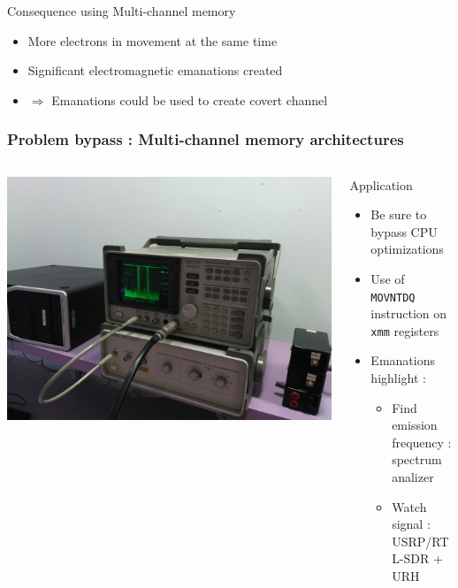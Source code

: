 \begin{frame}
\begin{block}{Consequence using Multi-channel memory}
\begin{itemize}
\item More electrons in movement at the same time
\item Significant electromagnetic emanations created
\item $\Rightarrow$ Emanations could be used to create covert channel
\end{itemize}
\end{block}

\end{frame}

\begin{frame}
\frametitle{Problem bypass : Multi-channel memory architectures}

\begin{columns}[c] %
\begin{column}{.28\textwidth}
\centering \includegraphics[scale=.13]{images/spectrum.jpg}
\end{column}%
\hfill%
\begin{column}{.5\textwidth}
\begin{block}{Application}
\begin{itemize}
\item Be sure to bypass CPU optimizations
\item Use of \texttt{MOVNTDQ} instruction on \texttt{xmm} registers
\item Emanations highlight :
\begin{itemize}
\item Find emission frequency : spectrum analizer
\item Watch signal : USRP/RTL-SDR + URH
\end{itemize}
\end{itemize}
\end{block}
\end{column}%
\end{columns}

\end{frame}



